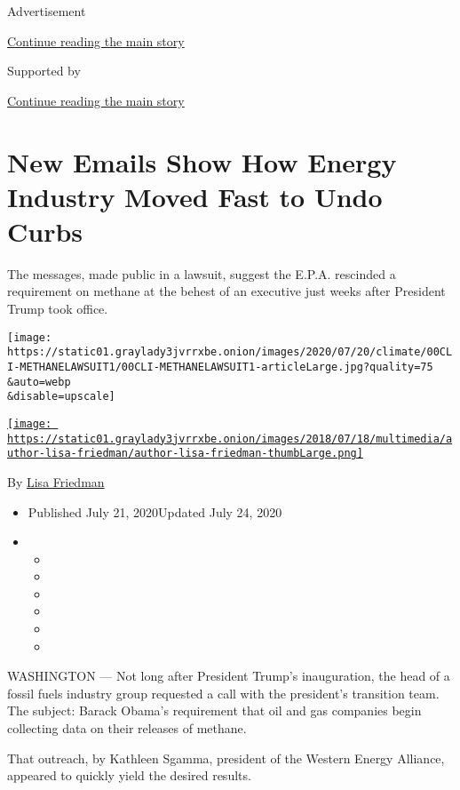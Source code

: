 Advertisement

\protect\hyperlink{after-top}{Continue reading the main story}

Supported by

\protect\hyperlink{after-sponsor}{Continue reading the main story}

\hypertarget{new-emails-show-how-energy-industry-moved-fast-to-undo-curbs}{%
\section{New Emails Show How Energy Industry Moved Fast to Undo
Curbs}\label{new-emails-show-how-energy-industry-moved-fast-to-undo-curbs}}

The messages, made public in a lawsuit, suggest the E.P.A. rescinded a
requirement on methane at the behest of an executive just weeks after
President Trump took office.

\texttt{[image: https://static01.graylady3jvrrxbe.onion/images/2020/07/20/climate/00CLI-METHANELAWSUIT1/00CLI-METHANELAWSUIT1-articleLarge.jpg?quality=75\\\&auto=webp\\\&disable=upscale]}

\href{https://www.nytimes3xbfgragh.onion/by/lisa-friedman}{\texttt{[image: https://static01.graylady3jvrrxbe.onion/images/2018/07/18/multimedia/author-lisa-friedman/author-lisa-friedman-thumbLarge.png]}}

By \href{https://www.nytimes3xbfgragh.onion/by/lisa-friedman}{Lisa
Friedman}

\begin{itemize}
\item
  Published July 21, 2020Updated July 24, 2020
\item
  \begin{itemize}
  \item
  \item
  \item
  \item
  \item
  \item
  \end{itemize}
\end{itemize}

WASHINGTON --- Not long after President Trump's inauguration, the head
of a fossil fuels industry group requested a call with the president's
transition team. The subject: Barack Obama's requirement that oil and
gas companies begin collecting data on their releases of methane.

That outreach, by Kathleen Sgamma, president of the Western Energy
Alliance, appeared to quickly yield the desired results.

